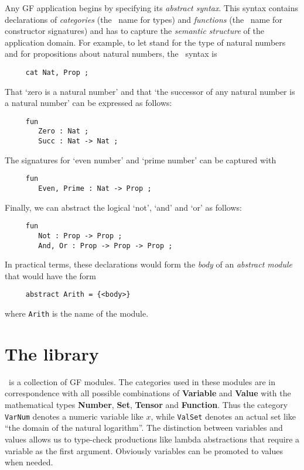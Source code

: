 \documentclass[adraft,copyright,creativecommons]{eptcs}
\begin{document}
Any GF application begins by specifying its \emph{abstract syntax}. This
syntax contains declarations of \emph{categories} (the \GF\  name for
types) and \emph{functions} (the \GF\ name for constructor signatures) and
has to capture the \emph{semantic structure} of the application domain.
For example, to let \Nat{} stand for the type of natural numbers and
\Prop{} for propositions about natural numbers, the \GF\ syntax is
{\small
\begin{verbatim}
     cat Nat, Prop ;
\end{verbatim}
}
That `zero is a natural number' and that `the successor of
any natural number is a natural number' can be expressed as follows:
{\small
\begin{verbatim}
     fun
        Zero : Nat ;
        Succ : Nat -> Nat ;
\end{verbatim}
}
The signatures for `even number' and `prime number' can be captured with
{\small
\begin{verbatim}
     fun
        Even, Prime : Nat -> Prop ;
\end{verbatim}
}
Finally, we can abstract the logical `not', `and' and `or' as follows:
{\small
\begin{verbatim}
     fun
        Not : Prop -> Prop ;
        And, Or : Prop -> Prop -> Prop ;
\end{verbatim}
}
In practical terms, these declarations would form the \emph{body} of an
\emph{abstract module} that would have the form
{\small
\begin{verbatim}
     abstract Arith = {<body>}
\end{verbatim}
}
where \texttt{Arith} is the name of the module.



\section{The library} %
\label{sec:the_library}

\MGL\ is a collection of GF modules. The categories used in these modules
are in correspondence with all possible combinations of \textbf{Variable}
and \textbf{Value} with the mathematical types
\textbf{Number}, \textbf{Set}, \textbf{Tensor} and \textbf{Function}.
Thus the category \texttt{VarNum} denotes a numeric
variable like $x$, while \texttt{ValSet} denotes an actual set like ``the
domain of the natural logarithm''.  The distinction between variables and
values allows us to type-check productions like lambda abstractions that
require a variable as the first argument.  Obviously variables can be
promoted to values when needed.
\end{document}

